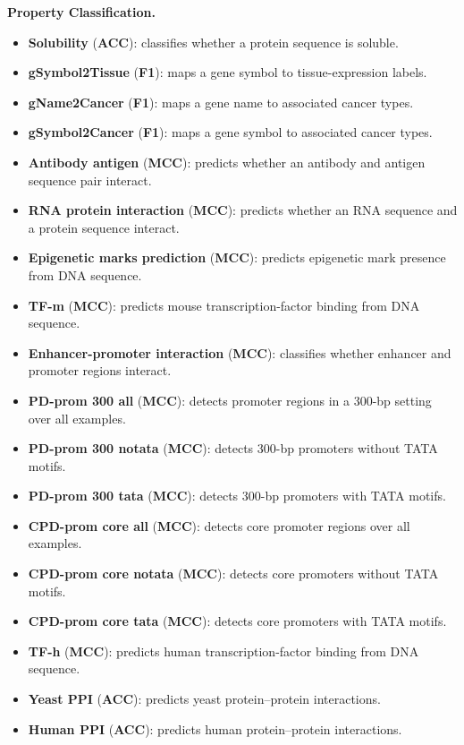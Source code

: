 \begin{appendices}
\textbf{Property Classification.}
\begin{itemize}
    \item \textbf{Solubility} (\textbf{ACC}): classifies whether a protein sequence is soluble.
    \item \textbf{gSymbol2Tissue} (\textbf{F1}): maps a gene symbol to tissue-expression labels.
    \item \textbf{gName2Cancer} (\textbf{F1}): maps a gene name to associated cancer types.
    \item \textbf{gSymbol2Cancer} (\textbf{F1}): maps a gene symbol to associated cancer types.
    \item \textbf{Antibody antigen} (\textbf{MCC}): predicts whether an antibody and antigen sequence pair interact.
    \item \textbf{RNA protein interaction} (\textbf{MCC}): predicts whether an RNA sequence and a protein sequence interact.
    \item \textbf{Epigenetic marks prediction} (\textbf{MCC}): predicts epigenetic mark presence from DNA sequence.
    \item \textbf{TF-m} (\textbf{MCC}): predicts mouse transcription-factor binding from DNA sequence.
    \item \textbf{Enhancer-promoter interaction} (\textbf{MCC}): classifies whether enhancer and promoter regions interact.
    \item \textbf{PD-prom 300 all} (\textbf{MCC}): detects promoter regions in a 300-bp setting over all examples.
    \item \textbf{PD-prom 300 notata} (\textbf{MCC}): detects 300-bp promoters without TATA motifs.
    \item \textbf{PD-prom 300 tata} (\textbf{MCC}): detects 300-bp promoters with TATA motifs.
    \item \textbf{CPD-prom core all} (\textbf{MCC}): detects core promoter regions over all examples.
    \item \textbf{CPD-prom core notata} (\textbf{MCC}): detects core promoters without TATA motifs.
    \item \textbf{CPD-prom core tata} (\textbf{MCC}): detects core promoters with TATA motifs.
    \item \textbf{TF-h} (\textbf{MCC}): predicts human transcription-factor binding from DNA sequence.
    \item \textbf{Yeast PPI} (\textbf{ACC}): predicts yeast protein--protein interactions.
    \item \textbf{Human PPI} (\textbf{ACC}): predicts human protein--protein interactions.

\end{itemize}
\end{appendices}
